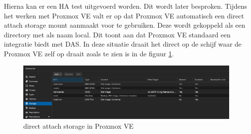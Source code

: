 Hierna kan er een HA test uitgevoerd worden. Dit wordt later besproken.
Tijdens het werken met Proxmox VE valt er op dat Proxmox VE automatisch een direct attach storage mount aanmaakt voor te gebruiken. Deze wordt gekoppeld als een directory met als naam local.
Dit toont aan dat Proxmox VE standaard een integratie biedt met DAS. In deze situatie draait het direct op de schijf waar de Proxmox VE zelf op draait zoals te zien is in de figuur \ref{fig:das-prox}.
\begin{figure}[H]
  \centering
  \includegraphics[width=1.2\textwidth]{../poc/das-proxmox.png}
  \caption{direct attach storage in Proxmox VE}
  \label{fig:das-prox}
\end{figure}


